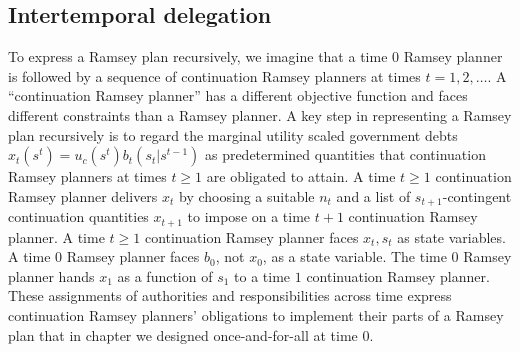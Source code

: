 %




\subsection{Intertemporal delegation}
  To express a Ramsey plan recursively,
we  imagine that  a time $0$ Ramsey planner is followed by a sequence of continuation Ramsey planners at times
$t = 1, 2, \ldots$. A ``continuation Ramsey planner''  has a different objective function and faces
different constraints than a Ramsey planner.
A key step in representing a Ramsey plan recursively is
 to regard the marginal utility scaled government debts $x_t(s^t) = u_c(s^t) b_t(s_t|s^{t-1})$  as  predetermined quantities
 that   continuation Ramsey planners at times $t \geq 1$ are obligated to attain.
 A time $t\geq 1$ continuation Ramsey planner  delivers $x_t$  by choosing a suitable $n_t$ and a list of $s_{t+1}$-contingent
continuation quantities $x_{t+1}$ to impose on   a time $t+1$ continuation Ramsey planner. A time $t \geq 1$ continuation Ramsey
planner faces $x_t, s_t$ as state variables.
A time $0$ Ramsey planner faces $b_0$,
not $x_0$, as a state variable.
The time $0$ Ramsey planner hands $x_1$ as a function of $s_1$  to a time
$1$ continuation Ramsey planner.
These assignments of
authorities and responsibilities across time    express  continuation Ramsey planners' obligations to
implement their parts of  a  Ramsey plan that in chapter   we  designed  once-and-for-all  at time $0$.





